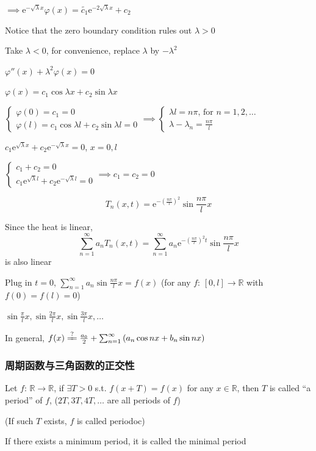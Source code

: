 $\implies\mathrm{e}^{-\sqrt{\lambda}x}\varphi(x)=\tilde{c_1}\mathrm{e}^{-2\sqrt{\lambda}x}+c_2$

Notice that the zero boundary condition rules out $\lambda>0$

Take $\lambda<0$, for convenience, replace $\lambda$ by $-\lambda^2$

$\varphi''(x)+\lambda^2\varphi(x)=0$

$\varphi(x)=c_1\cos\lambda x+c_2\sin\lambda x$

$\begin{cases}
        \varphi(0)=c_1=0 \\
        \varphi(l)=c_1\cos\lambda l+c_2\sin\lambda l=0
    \end{cases}\implies\begin{cases}
        \lambda l=n\pi\text{, for }n=1,2,\dots \\
        \lambda-\lambda_n=\frac{n\pi}{l}
    \end{cases}$

$c_1\mathrm{e}^{\sqrt{\lambda}x}+c_2\mathrm{e}^{-\sqrt{\lambda}x}=0$, $x=0,l$

$\begin{cases}
        c_1+c_2=0 \\
        c_1\mathrm{e}^{\sqrt{\lambda}l}+c_2\mathrm{e}^{-\sqrt{\lambda}l}=0
    \end{cases}\implies c_1=c_2=0$

$$\boxed{T_n(x,t)}=\mathrm{e}^{-\left(\frac{n\pi}{l}\right)^2}\sin\frac{n\pi}{l}x$$

Since the heat is linear,
$$\sum_{n=1}^{\infty}a_nT_n(x,t)=\sum_{n=1}^{\infty}a_n\mathrm{e}^{-\left(\frac{n\pi}{l}\right)^2t}\sin\frac{n\pi}{l}x$$
is also linear

Plug in $t=0$, $\sum_{n=1}^{\infty}a_n\sin\frac{n\pi}{l}x=f(x)$ (for any $f:\,[0,l]\to\mathbb{R}$ with $f(0)=f(l)=0$)

$\sin\frac{\pi}{l}x,\sin\frac{2\pi}{l}x,\sin\frac{3\pi}{l}x,\dots$

In general, $f(x)\xlongequal{?}\frac{a_0}{2}+\sum_{n=1}^{\infty}\left(a_n\cos nx+b_n\sin nx\right)$

\subsubsection{周期函数与三角函数的正交性}

\begin{definition}
    Let $f:\,\mathbb{R}\to\mathbb{R}$, if $\exists T>0$ s.t. $f(x+T)=f(x)$ for any $x\in\mathbb{R}$, then $T$ is called ``a period'' of $f$, ($2T,3T,4T,\dots$ are all periods of $f$)

    (If such $T$ exists, $f$ is called periodoc)

    If there exists a minimum period, it is called the minimal period
\end{definition}

